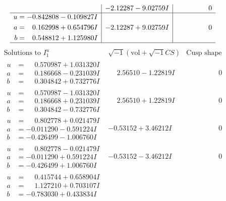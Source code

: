 \documentclass[1p]{elsarticle_modified}
\theoremstyle{definition}
\newcommand{\I}{\sqrt{-1}}
\begin{document}
$$\begin{array}{c|c|c}
 & -2.12287 - 9.02759 I & \phantom{-0.000000 } 0 \\ \hline\begin{aligned}
u &= -0.842808 - 0.109827 I \\
a &= \phantom{-}0.162998 + 0.654796 I \\
b &= \phantom{-}0.548812 + 1.125980 I\end{aligned}
 & -2.12287 + 9.02759 I & \phantom{-0.000000 } 0\\
 \hline 
 \end{array}$$\newpage$$\begin{array}{c|c|c}  
\text{Solutions to }I^u_{1}& \I (\text{vol} + \sqrt{-1}CS) & \text{Cusp shape}\\
 \hline 
\begin{aligned}
u &= \phantom{-}0.570987 + 1.031320 I \\
a &= \phantom{-}0.186668 - 0.231039 I \\
b &= \phantom{-}0.304842 + 0.732776 I\end{aligned}
 & \phantom{-}2.56510 - 1.22819 I & \phantom{-0.000000 } 0 \\ \hline\begin{aligned}
u &= \phantom{-}0.570987 - 1.031320 I \\
a &= \phantom{-}0.186668 + 0.231039 I \\
b &= \phantom{-}0.304842 - 0.732776 I\end{aligned}
 & \phantom{-}2.56510 + 1.22819 I & \phantom{-0.000000 } 0 \\ \hline\begin{aligned}
u &= \phantom{-}0.802778 + 0.021479 I \\
a &= -0.011290 - 0.591224 I \\
b &= -0.426499 - 1.006760 I\end{aligned}
 & -0.53152 + 3.46212 I & \phantom{-0.000000 } 0 \\ \hline\begin{aligned}
u &= \phantom{-}0.802778 - 0.021479 I \\
a &= -0.011290 + 0.591224 I \\
b &= -0.426499 + 1.006760 I\end{aligned}
 & -0.53152 - 3.46212 I & \phantom{-0.000000 } 0 \\ \hline\begin{aligned}
u &= \phantom{-}0.415744 + 0.658904 I \\
a &= \phantom{-}1.127210 + 0.703107 I \\
b &= -0.783030 + 0.433834 I\end{aligned}

\end{array}$$
\end{document}
